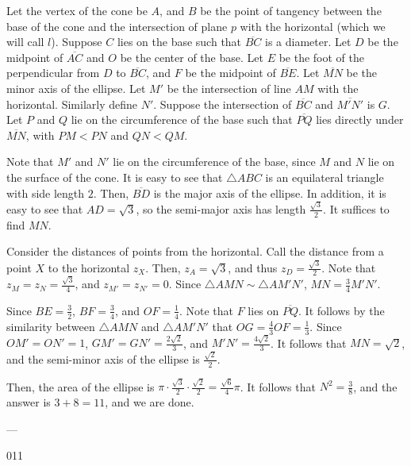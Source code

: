 Let the vertex of the cone be $A$, and $B$ be the point of tangency between the base of the cone and the intersection of plane $p$ with the horizontal (which we will call $l$). Suppose $C$ lies on the base such that $\overline{BC}$ is a diameter. Let $D$ be the midpoint of $\overline{AC}$ and $O$ be the center of the base. Let $E$ be the foot of the perpendicular from $D$ to $\overline{BC}$, and $F$ be the midpoint of $\overline{BE}$. Let $\overline{MN}$ be the minor axis of the ellipse. Let $M'$ be the intersection of line $AM$ with the horizontal. Similarly define $N'$. Suppose the intersection of $\overline{BC}$ and $\overline{M'N'}$ is $G$. Let $P$ and $Q$ lie on the circumference of the base such that $\overline{PQ}$ lies directly under $\overline{MN}$, with $PM<PN$ and $QN<QM$. 

Note that $M'$ and $N'$ lie on the circumference of the base, since $M$ and $N$ lie on the surface of the cone. It is easy to see that $\triangle ABC$ is an equilateral triangle with side length $2$. Then, $\overline{BD}$ is the major axis of the ellipse. In addition, it is easy to see that $AD=\sqrt{3}$, so the semi-major axis has length $\frac{\sqrt{3}}{2}$. It suffices to find $MN$. 

Consider the distances of points from the horizontal. Call the distance from a point $X$ to the horizontal $z_X$. Then, $z_A=\sqrt{3}$, and thus $z_D=\frac{\sqrt{3}}{2}$. Note that $z_M=z_N=\frac{\sqrt{3}}{4}$, and $z_{M'}=z_{N'}=0$. Since $\triangle AMN\sim\triangle AM'N'$, $MN=\frac{3}{4}M'N'$. 

Since $BE=\frac{3}{2}$, $BF=\frac{3}{4}$, and $OF=\frac{1}{4}$. Note that $F$ lies on $\overline{PQ}$. It follows by the similarity between $\triangle AMN$ and $\triangle AM'N'$ that $OG=\frac{4}{3}OF=\frac{1}{3}$. Since $OM'=ON'=1$, $GM'=GN'=\frac{2\sqrt{2}}{3}$, and $M'N'=\frac{4\sqrt{2}}{3}$. It follows that $MN=\sqrt{2}$, and the semi-minor axis of the ellipse is $\frac{\sqrt{2}}{2}$. 

Then, the area of the ellipse is $\pi\cdot\frac{\sqrt{3}}{2}\cdot\frac{\sqrt{2}}{2}=\frac{\sqrt{6}}{4}\pi$. It follows that $N^2=\frac{3}{8}$, and the answer is $3+8=11$, and we are done.

---

011
